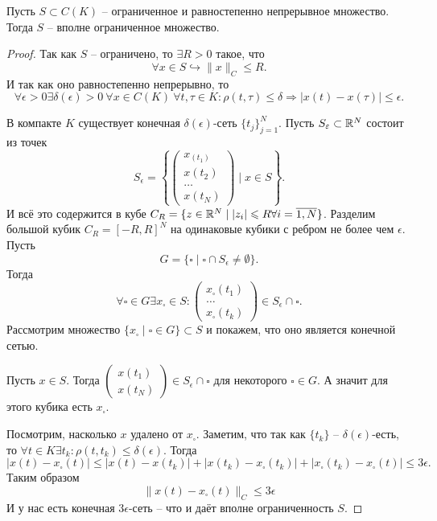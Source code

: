 \begin{theorem}
    Пусть $S \subset C(K)$ -- ограниченное и равностепенно непрерывное множество.
    Тогда $S$ -- вполне ограниченное множество.
\end{theorem}
\begin{proof}
    Так как $S$ -- ограничено, то $\exists R > 0$ такое, что
    \[
        \forall x \in S \hookrightarrow \|x\|_C \leq R.
    \]
    И так как оно равностепенно непрерывно, то
    \[
        \forall \epsilon > 0 \exists \delta(\epsilon) > 0 \ \forall x \in C(K) \ \forall t, \tau \in K\colon \rho(t, \tau) \leq \delta \Rightarrow |x(t) - x(\tau)| \leq \epsilon.
    \]

    В компакте $K$ существует конечная $\delta(\epsilon)$-сеть $\{t_j\}_{j = 1}^{N}$.
    Пусть $S_{\varepsilon} \subset \mathbb{R}^N$ состоит из точек
    \[
        S_{\epsilon} = \left\{\begin{pmatrix*} x_(t_1) \\ x(t_2) \\ \ldots \\ x(t_N)
        \end{pmatrix*} \mid x \in S  \right\}.
    \]
    И всё это содержится в кубе $C_R = \{z \in \mathbb{R}^N \mid |z_i| \leqslant R \forall i = \overline{1, N}\}$.
    Разделим большой кубик $C_R = [-R, R]^N$ на одинаковые кубики с ребром не более чем $\epsilon$.
    Пусть
    \[
        G = \{\square \mid \square \cap S_\epsilon \neq \emptyset\}.
    \]
    Тогда
    \[\forall \square \in G \exists x_{\square} \in S\colon \begin{pmatrix*} x_{\square}(t_1) \\ \ldots \\ x_{\square}(t_k)
    \end{pmatrix*} \in S_\epsilon \cap \square.
    \]
    Рассмотрим множество $\{x_\square \mid \square \in G\} \subset S$ и покажем, что оно является конечной сетью.

    Пусть $x \in S$.
    Тогда $\begin{pmatrix*} x(t_1) \\ x(t_N)
    \end{pmatrix*} \in S_\epsilon \cap \square$ для некоторого $\square \in G$.
    А значит для этого кубика есть $x_\square$.

    Посмотрим, насколько $x$ удалено от $x_\square$.
    Заметим, что так как $\{t_k\}$ -- $\delta(\epsilon)$-есть, то $\forall t \in K \exists t_k\colon \rho(t, t_k) \leq \delta(\epsilon)$.
    Тогда
    \[
        |x(t) - x_\square(t)| \leq |x(t) - x(t_k)| + |x(t_k) - x_\square(t_k)| + |x_{\square}(t_k) - x_{\square}(t)| \leq 3\epsilon.
    \]
    Таким образом
    \[
        \|x(t) - x_{\square}(t)\|_C \leq 3\epsilon
    \]
    И у нас есть конечная $3\epsilon$-сеть -- что и даёт вполне ограниченность $S$.
\end{proof}
